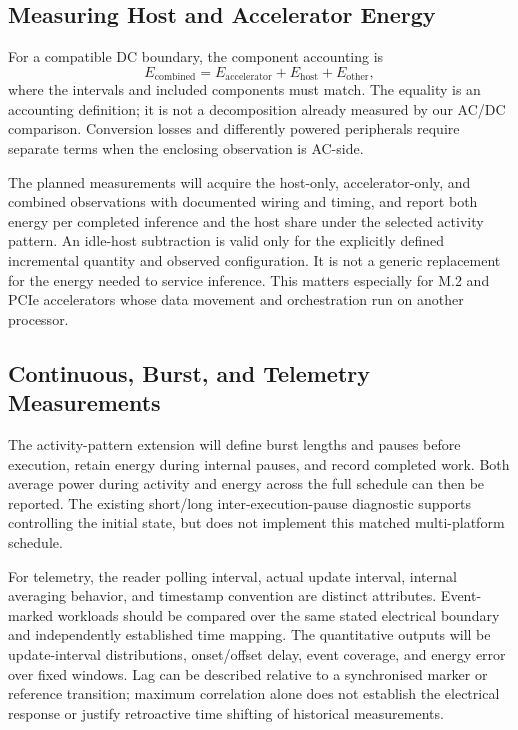 \subsection{Measuring Host and Accelerator Energy}
For a compatible DC boundary, the component accounting is
\begin{equation}
E_{\mathrm{combined}}=E_{\mathrm{accelerator}}+E_{\mathrm{host}}+E_{\mathrm{other}},
\label{eq:boundary-sum}
\end{equation}
where the intervals and included components must match. The equality is an accounting definition; it is not a decomposition already measured by our AC/DC comparison. Conversion losses and differently powered peripherals require separate terms when the enclosing observation is AC-side.

The planned measurements will acquire the host-only, accelerator-only, and combined observations with documented wiring and timing, and report both energy per completed inference and the host share under the selected activity pattern. An idle-host subtraction is valid only for the explicitly defined incremental quantity and observed configuration. It is not a generic replacement for the energy needed to service inference. This matters especially for M.2 and PCIe accelerators whose data movement and orchestration run on another processor.


\subsection{Continuous, Burst, and Telemetry Measurements}
The activity-pattern extension will define burst lengths and pauses before execution, retain energy during internal pauses, and record completed work. Both average power during activity and energy across the full schedule can then be reported. The existing short/long inter-execution-pause diagnostic supports controlling the initial state, but does not implement this matched multi-platform schedule.

For telemetry, the reader polling interval, actual update interval, internal averaging behavior, and timestamp convention are distinct attributes. Event-marked workloads should be compared over the same stated electrical boundary and independently established time mapping. The quantitative outputs will be update-interval distributions, onset/offset delay, event coverage, and energy error over fixed windows. Lag can be described relative to a synchronised marker or reference transition; maximum correlation alone does not establish the electrical response or justify retroactive time shifting of historical measurements.

